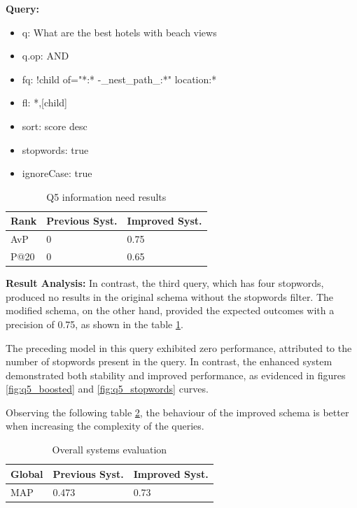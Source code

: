 \documentclass[sigconf]{acmart}
\begin{document}
\textbf{Query:}

\begin{itemize}
    \item q: What are the best hotels with beach views
    \item q.op: AND
    \item fq: {!child of="*:* -\_nest\_path\_:*"} location:*
    \item fl: *,[child]
    \item sort: score desc
    \item stopwords: true
    \item ignoreCase: true
\end{itemize}

\begin{table}[H]
\caption{Q5 information need results}
\label{tab:q7}
\begin{tabular}{lll}
\toprule
Rank & Previous Syst. & Improved Syst.\\
\midrule
AvP & 0 & 0.75  \\
P@20 & 0 & 0.65 \\
\bottomrule
\end{tabular}
\end{table}

\textbf{Result Analysis:} In contrast, the third query, which has four stopwords, produced no results in the original schema without the stopwords filter. The modified schema, on the other hand, provided the expected outcomes with a precision of 0.75, as shown in the table \ref{tab:q7}.

The preceding model in this query exhibited zero performance, attributed to the number of stopwords present in the query. In contrast, the enhanced system demonstrated both stability and improved performance, as evidenced in figures \ref{fig:q5_boosted} and \ref{fig:q5_stopwords} curves.

Observing the following table \ref{tab:map_stopwords}, the behaviour of the improved schema is better when increasing the complexity of the queries.

\begin{table}[H]
\caption{Overall systems evaluation}
\label{tab:map_stopwords}
\begin{tabular}{lll}
\toprule
Global & Previous Syst. & Improved Syst.\\
\midrule
MAP & 0.473 & 0.73  \\

\bottomrule
\end{tabular}
\end{table}
\end{document}
